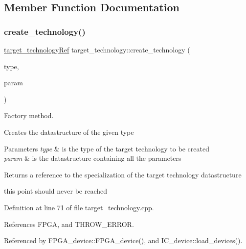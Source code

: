 \subsection{Member Function Documentation}
\mbox{\label{classtarget__technology_ad1a3a587984c7728ee7999f58a56c21a}} 
\subsubsection{\texorpdfstring{create\+\_\+technology()}{create\_technology()}}
{\footnotesize\ttfamily \hyperlink{target__technology_8hpp_a16af97aadc4eb998c2c9ec7fba5ccecd}{target\+\_\+technology\+Ref} target\+\_\+technology\+::create\+\_\+technology (\begin{DoxyParamCaption}\item[{const \hyperlink{classtarget__technology_a84257c2d384aa7dce6a060105113459b}{target\+\_\+t}}]{type,  }\item[{const \hyperlink{Parameter_8hpp_a37841774a6fcb479b597fdf8955eb4ea}{Parameter\+Const\+Ref} \&}]{param }\end{DoxyParamCaption})\hspace{0.3cm}{\ttfamily [static]}}



Factory method. 

Creates the datastructure of the given type 
\begin{DoxyParams}{Parameters}
{\em type} & is the type of the target technology to be created \\
\hline
{\em param} & is the datastructure containing all the parameters \\
\hline
\end{DoxyParams}
\begin{DoxyReturn}{Returns}
a reference to the specialization of the target technology datastructure 
\end{DoxyReturn}
this point should never be reached 

Definition at line 71 of file target\+\_\+technology.\+cpp.



References F\+P\+GA, and T\+H\+R\+O\+W\+\_\+\+E\+R\+R\+OR.



Referenced by F\+P\+G\+A\+\_\+device\+::\+F\+P\+G\+A\+\_\+device(), and I\+C\+\_\+device\+::load\+\_\+devices().

